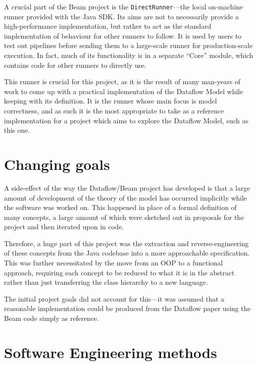 
A crucial part of the Beam project is the \verb|DirectRunner|---the local on-machine runner provided with the Java SDK.
Its aims are not to necessarily provide a high-performance implementation, but rather to act as the standard implementation of behaviour for other runners to follow.
It is used by users to test out pipelines before sending them to a large-scale runner for production-scale execution.
In fact, much of its functionality is in a separate ``Core'' module, which contains code for other runners to directly use.

This runner is crucial for this project, as it is the result of many man-years of work to come up with a practical implementation of the Dataflow Model while keeping with its definition.
It is the runner whose main focus is model correctness, and as such it is the most appropriate to take as a reference implementation for a project which aims to explore the Dataflow Model, such as this one.


\section{Changing goals}

A side-effect of the way the Dataflow/Beam project has developed is that a large amount of development of the theory of the model has occurred implicitly while the software was worked on.
This happened in place of a formal definition of many concepts, a large amount of which were sketched out in proposals for the project and then iterated upon in code.

Therefore, a huge part of this project was the extraction and reverse-engineering of these concepts from the Java codebase into a more approachable specification.
This was further necessitated by the move from an OOP to a functional approach, requiring each concept to be reduced to what it is in the abstract rather than just transferring the class hierarchy to a new language.

The initial project goals did not account for this---it was assumed that a reasonable implementation could be produced from the Dataflow paper \cite{Akidau:2015} using the Beam code simply as reference.


\section{Software Engineering methods}\label{sec:prep:softeng}

